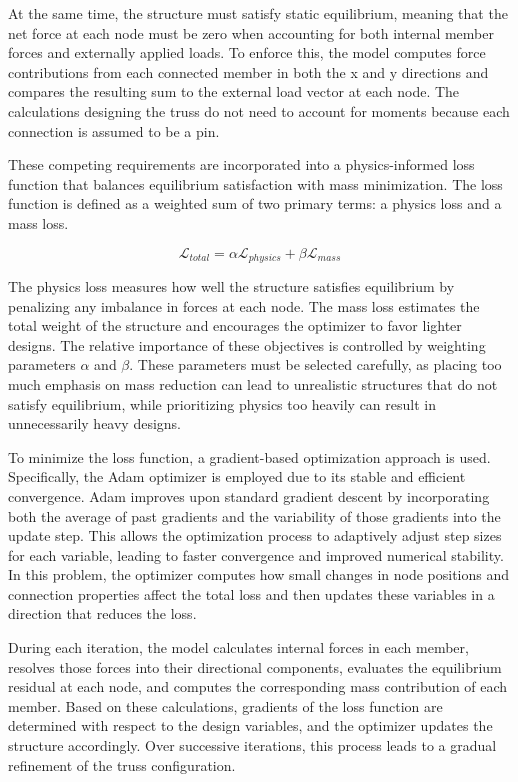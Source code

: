 \documentclass[11pt]{article}
\begin{document}
At the same time, the structure must satisfy static equilibrium, meaning that the net force at each node must be zero when accounting for both internal member forces and externally applied loads. To enforce this, the model computes force contributions from each connected member in both the x and y directions and compares the resulting sum to the external load vector at each node. The calculations designing the truss do not need to account for moments because each connection is assumed to be a pin.

These competing requirements are incorporated into a physics-informed loss function that balances equilibrium satisfaction with mass minimization. The loss function is defined as a weighted sum of two primary terms: a physics loss and a mass loss.

\begin{equation}
  \mathcal{L}_{total} = \alpha \mathcal{L}_{physics} + \beta \mathcal{L}_{mass}
\end{equation}

The physics loss measures how well the structure satisfies equilibrium by penalizing any imbalance in forces at each node. The mass loss estimates the total weight of the structure and encourages the optimizer to favor lighter designs. The relative importance of these objectives is controlled by weighting parameters $\alpha$ and $\beta$. These parameters must be selected carefully, as placing too much emphasis on mass reduction can lead to unrealistic structures that do not satisfy equilibrium, while prioritizing physics too heavily can result in unnecessarily heavy designs.

To minimize the loss function, a gradient-based optimization approach is used. Specifically, the Adam optimizer is employed due to its stable and efficient convergence. Adam improves upon standard gradient descent by incorporating both the average of past gradients and the variability of those gradients into the update step. This allows the optimization process to adaptively adjust step sizes for each variable, leading to faster convergence and improved numerical stability. In this problem, the optimizer computes how small changes in node positions and connection properties affect the total loss and then updates these variables in a direction that reduces the loss.

During each iteration, the model calculates internal forces in each member, resolves those forces into their directional components, evaluates the equilibrium residual at each node, and computes the corresponding mass contribution of each member. Based on these calculations, gradients of the loss function are determined with respect to the design variables, and the optimizer updates the structure accordingly. Over successive iterations, this process leads to a gradual refinement of the truss configuration.
\end{document}

